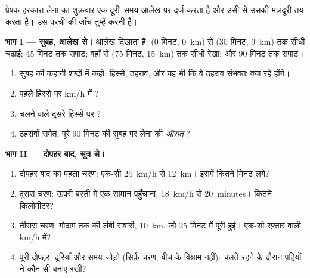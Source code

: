 \begin{problem}\label{pb:g7:motion-average-speed:1}
प्रेषक हरकारा लेना का शुक्रवार एक दूरी--समय आलेख पर दर्ज करता है और
उसी से उसकी मज़दूरी तय करता है। उस परची की जाँच तुम्हें करनी है।

\medskip\noindent\textbf{भाग I --- सुबह, आलेख से।}
आलेख दिखाता है: ($0$ मिनट, \qty{0}{km}) से ($30$ मिनट, \qty{9}{km})
तक सीधी चढ़ाई; $45$ मिनट तक सपाट; वहाँ से ($75$ मिनट, \qty{15}{km})
तक सीधी रेखा; और $90$ मिनट तक सपाट।
\begin{enumerate}
  \item सुबह की कहानी शब्दों में कहो: हिस्से, ठहराव, और यह भी कि वे
        ठहराव संभवतः क्या रहे होंगे।
  \item पहले हिस्से पर \unit{km/h} में ?
  \item चलने वाले दूसरे हिस्से पर ?
  \item ठहरावों समेत, पूरे $90$ मिनट की सुबह पर लेना की \emph{औसत}
        ?
\end{enumerate}

\medskip\noindent\textbf{भाग II --- दोपहर बाद, सूत्र से।}
\begin{enumerate}[resume]
  \item दोपहर बाद का पहला चरण: एक-सी \qty{24}{km/h} से \qty{12}{km}।
        इसमें कितने मिनट लगे?
  \item दूसरा चरण: ऊपरी बस्ती में एक सामान पहुँचाना, \qty{18}{km/h}
        से \qty{20}{minutes}। कितने किलोमीटर?
  \item तीसरा चरण: गोदाम तक की लंबी सवारी, \qty{10}{km}, जो $25$ मिनट
        में पूरी हुई। एक-सी रफ़्तार वाली  \unit{km/h} में?
  \item पूरी दोपहर: दूरियाँ और समय जोड़ो (सिर्फ़ चरण, बीच के
        विश्राम नहीं): चलते रहने के दौरान पहियों ने कौन-सी 
        बनाए रखी?
\end{enumerate}


\end{problem}

